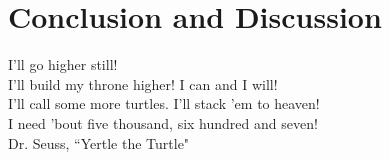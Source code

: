\chapter{Conclusion and Discussion}
\label{conclusion_chapter}

\begin{flushright}
I'll go higher still!\\
I'll build my throne higher! I can and I will!\\
I'll call some more turtles.  I'll stack 'em to heaven!\\
I need 'bout five thousand, six hundred and seven!\\
Dr. Seuss, ``Yertle the Turtle"
\end{flushright}
